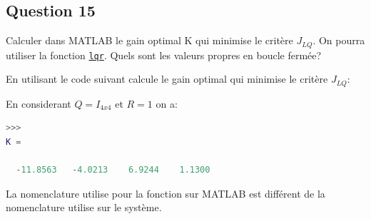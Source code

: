 \documentclass[class=article, crop=false]{standalone}
\begin{document}
\subsection{Question 15}
\begin{exercise}
    Calculer dans MATLAB le gain optimal K qui minimise le critère $J_{LQ}$. On pourra utiliser la fonction \href{https://www.mathworks.com/help/control/ref/lti.lqr.html}{\texttt{lqr}}. Quels sont les valeurs propres en boucle fermée?
\end{exercise}
\begin{resolution}
    En utilisant le code suivant calcule le gain optimal qui minimise le critère $J_{LQ}$:
    \begin{scriptsize}\mycode
        
    \end{scriptsize}
    En considerant $Q = I_{4x4}$ et $R = 1$ on a:
    \begin{scriptsize}\mycode
        \begin{lstlisting}[language=Matlab]
>>>
K =

  -11.8563   -4.0213    6.9244    1.1300
        \end{lstlisting}
    \end{scriptsize}
    \begin{remark}
        La nomenclature utilise pour la fonction sur MATLAB est différent de la nomenclature utilise sur le système.
    \end{remark}
\end{resolution}

\newpage
\end{document}
